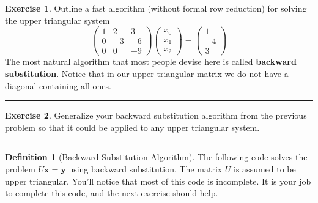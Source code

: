 \documentclass[
]{book}
\theoremstyle{definition}
\newtheorem{definition}{Definition}[chapter]
\theoremstyle{definition}
\theoremstyle{definition}
\newtheorem{exercise}{Exercise}[chapter]
\theoremstyle{remark}
\begin{document}
\begin{exercise}
\protect\hypertarget{exr:unnamed-chunk-328}{}{\label{exr:unnamed-chunk-328} }Outline a fast algorithm (without formal row reduction) for solving the upper triangular system
\[\begin{pmatrix} 1 & 2 & 3 \\ 0 & -3 & -6 \\ 0 & 0 & -9 \end{pmatrix} \begin{pmatrix} x_0 \\ x_1 \\ x_2 \end{pmatrix} = \begin{pmatrix} 1 \\ -4 \\ 3\end{pmatrix}\]
The most natural algorithm that most people devise here is called \textbf{backward substitution}. Notice that in our upper
triangular matrix we do not have a diagonal containing all ones.
\end{exercise}

\begin{center}\rule{0.5\linewidth}{0.5pt}\end{center}

\begin{exercise}
\protect\hypertarget{exr:unnamed-chunk-329}{}{\label{exr:unnamed-chunk-329} }Generalize your backward substitution algorithm from the previous problem so that it could be applied to any upper triangular system.
\end{exercise}

\begin{center}\rule{0.5\linewidth}{0.5pt}\end{center}

\begin{definition}[Backward Substitution Algorithm]
\protect\hypertarget{def:usolve}{}{\label{def:usolve} {} }The following code solves the problem \(U \boldsymbol{x} = \boldsymbol{y}\) using backward substitution. The matrix \(U\) is assumed to be upper triangular. You'll notice that most of this code is incomplete. It is your job to complete this code, and the next exercise should help.
\end{definition}
\end{document}
